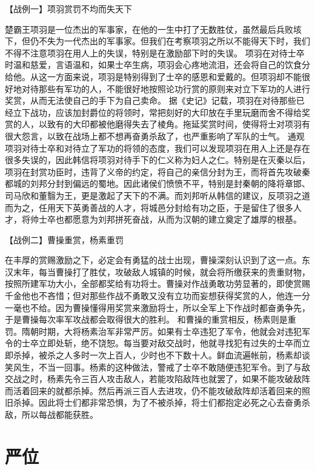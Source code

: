 \documentclass[a4paper,12pt,UTF8,twoside]{ctexbook}
\begin{document}
【战例一】项羽赏罚不均而失天下

楚霸王项羽是一位杰出的军事家，在他的一生中打了无数胜仗，虽然最后兵败垓下，但仍不失为一代杰出的军事家。但我们在考察项羽之所以不能得天下时，我们不得不注意项羽在用人上的失误，特别是在激励部下时的失误。
项羽在对待士卒时温和慈爱，言语温和，如果士卒生病，项羽会心疼地流泪，还会将自己的饮食分给他。从这一方面来说，项羽是特别得到了士卒的感恩和爱戴的。但项羽却不能很好地对待那些有军功的人，不能很好地按照论功行赏的原则来对立下军功的人进行奖赏，从而无法使自己的手下为自己卖命。
据《史记》记载，项羽在对待那些已经立下战功，应该加封爵位的将领时，常把刻好的大印放在手里玩磨而舍不得给奖赏的人，以致有的大印都被他磨得失去了棱角。拖延奖赏时间，使得将士对项羽有很大怨言，以致在战场上都不想再奋勇杀敌了，也严重影响了军队的士气。
通观项羽对待士卒和对待立了军功的将领的态度，我们可以发现项羽在用人上还是存在很多失误的，因此韩信将项羽对待手下的仁义称为妇人之仁。特别是在灭秦以后，项羽在封赏功臣时，违背了义帝的约定，将自己的亲信分封为王，而将首先攻破秦都城的刘邦分封到偏远的蜀地。因此诸侯们愤愤不平，特别是封秦朝的降将章邯、司马欣和董翳为王，更是激起了天下的不满。而刘邦听从韩信的建议，反项羽之道而为之，任用天下英勇善战的人才，将城邑分封给有功之臣，于是留住了很多人才，将帅士卒也都愿意为刘邦拼死奋战，从而为汉朝的建立奠定了雄厚的根基。


【战例二】曹操重赏，杨素重罚

在丰厚的赏赐激励之下，必定会有勇猛的战士出现，曹操深刻认识到了这一点。东汉末年，每当曹操打了胜仗，攻破敌人城镇的时候，就会将所缴获来的贵重财物，按照所建军功大小，全部都奖给有功将士。曹操对作战勇敢功劳显著的，即使赏赐千金他也不吝惜；但对那些作战不勇敢又没有立功而妄想获得奖赏的人，他连一分一毫也不给。因为曹操懂得用奖赏来激励将士，所以全军上下作战时都奋勇争先，于是曹操每次率军攻战都会取得很大的胜利。
和曹操的重赏相反，杨素则是重罚。隋朝时期，大将杨素治军非常严厉。如果有士卒违犯了军令，他就会对违犯军令的士卒立即处斩，绝不饶恕。每当要对敌交战时，他就寻找犯有过失的士卒而立即杀掉，被杀之人多时一次上百人，少时也不下数十人。鲜血流遍帐前，杨素却谈笑风生，不当一回事。杨素的这种做法，警戒了士卒不敢随便违犯军令。到了与敌交战之时，杨素先令三百人攻击敌人，若能攻陷敌阵也就罢了，如果不能攻破敌阵而活着回来的就都杀掉。然后再派三百人去进攻，仍不能攻破敌阵却活着回来的照旧杀掉。因此将士们都非常恐惧，为了不被杀掉，将士们都抱定必死之心去奋勇杀敌，所以每战都能获胜。


\chapter{严位}
\end{document}
